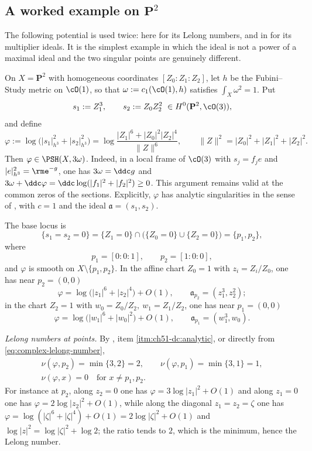 \subsection{A worked example on \texorpdfstring{$\mathbf P^2$}{P2}}
\label{sec:ch51-p2-example}

The following potential is used twice: here for its Lelong numbers, and in
 for its multiplier ideals.  It is the simplest
example in which the ideal is not a power of a maximal ideal and the two
singular points are genuinely different.

\begin{example}
\label{ex:ch51-p2-lelong}
On $X=\mathbf P^2$ with homogeneous coordinates $[Z_0:Z_1:Z_2]$, let
$h$ be the Fubini--Study metric on $\cO(1)$, so that
$\omega:=c_1(\cO(1),h)$ satisfies $\int_X\omega^2=1$.  Put
\[
 s_1:=Z_1^3,\qquad s_2:=Z_0Z_2^2\ \in H^0(\mathbf P^2,\cO(3)),
\]
and define
\[
 \varphi:=\log\bigl(|s_1|^2_{h^3}+|s_2|^2_{h^3}\bigr)
 =\log\frac{|Z_1|^6+|Z_0|^2|Z_2|^4}{\|Z\|^6},
 \qquad
 \|Z\|^2=|Z_0|^2+|Z_1|^2+|Z_2|^2 .
\]
Then $\varphi\in\PSH(X,3\omega)$.  Indeed, in a local frame of
$\cO(3)$ with $s_j=f_j e$ and $|e|_{h^3}^2=\rme^{-g}$,
one has $3\omega=\ddc g$ and
$3\omega+\ddc\varphi=\ddc\log(|f_1|^2+|f_2|^2)\geq0$.
This argument remains valid at the common zeros of the sections.
Explicitly, $\varphi$ has analytic
singularities in the sense of ,
with $c=1$ and the ideal $\mathfrak a=(s_1,s_2)$.

The base locus is
\[
 \{s_1=s_2=0\}
 =\{Z_1=0\}\cap\bigl(\{Z_0=0\}\cup\{Z_2=0\}\bigr)
 =\{p_1,p_2\},
\]
where
\[
 p_1=[0:0:1],
 \qquad
 p_2=[1:0:0],
\]
and $\varphi$ is smooth on $X\setminus\{p_1,p_2\}$.  In the affine
chart $Z_0=1$ with $z_i=Z_i/Z_0$, one has near $p_2=(0,0)$
\[
 \varphi=\log\bigl(|z_1|^6+|z_2|^4\bigr)+O(1),
 \qquad
 \mathfrak a_{p_2}=(z_1^3,z_2^2);
\]
in the chart $Z_2=1$ with $w_0=Z_0/Z_2,\ w_1=Z_1/Z_2$, one has near
$p_1=(0,0)$
\[
 \varphi=\log\bigl(|w_1|^6+|w_0|^2\bigr)+O(1),
 \qquad
 \mathfrak a_{p_1}=(w_1^3,w_0).
\]

\emph{Lelong numbers at points.}  By
, item \cref{itm:ch51-dc:analytic}, or
directly from \eqref{eq:complex-lelong-number},
\[
 \begin{gathered}
 \nu(\varphi,p_2)=\min\{3,2\}=2,
 \qquad
 \nu(\varphi,p_1)=\min\{3,1\}=1,\\
 \nu(\varphi,x)=0\quad\text{for }x\neq p_1,p_2 .
 \end{gathered}
\]
For instance at $p_2$, along $z_2=0$ one has
$\varphi=3\log|z_1|^2+O(1)$ and along $z_1=0$ one has
$\varphi=2\log|z_2|^2+O(1)$, while along the diagonal
$z_1=z_2=\zeta$ one has $\varphi=\log(|\zeta|^6+|\zeta|^4)+O(1)
=2\log|\zeta|^2+O(1)$ and $\log|z|^2=\log|\zeta|^2+\log2$; the ratio
tends to $2$, which is the minimum, hence the Lelong number.


\end{example}

